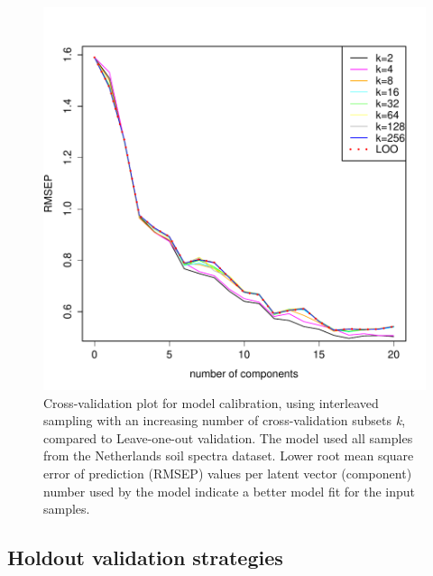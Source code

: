 \documentclass{isprs}
\begin{document}
\begin{figure}[ht!]
\includegraphics[width=1.0\columnwidth]{../script/output/interleaved-group-sizes.pdf}
\begin{center}
    \caption{Cross-validation plot for model calibration, using interleaved sampling with an increasing number of cross-validation subsets \textit{k}, compared to Leave-one-out validation. The model used all samples from the Netherlands soil spectra dataset. Lower root mean square error of prediction (RMSEP) values per latent vector (component) number used by the model indicate a better model fit for the input samples.}
    \label{fig:interleaved-group-sizes}
\end{center}
\end{figure}

\subsection{Holdout validation strategies}\label{sec:Holdout validation strategies}
\end{document}
